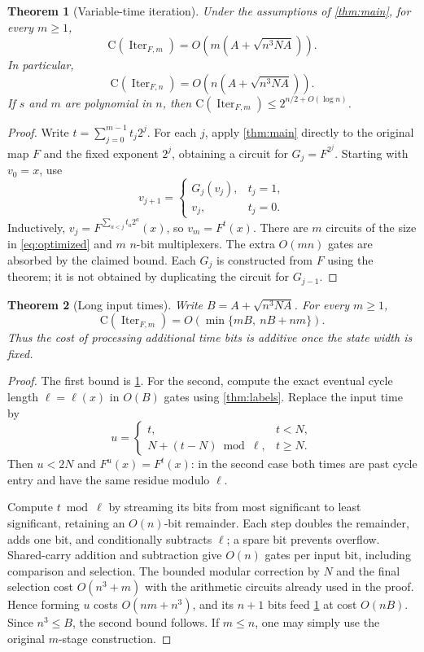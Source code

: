 \documentclass[11pt]{article}
\newtheorem{theorem}{Theorem}[section]
\theoremstyle{definition}
\theoremstyle{remark}
\newcommand{\CC}{\mathrm{C}}
\newcommand{\Iter}{\operatorname{Iter}}
\numberwithin{equation}{section}
\begin{document}
\begin{theorem}[Variable-time iteration]\label{thm:variable}
Under the assumptions of \cref{thm:main}, for every $m\geq 1$,
\begin{equation}\label{eq:variable}
  \CC(\Iter_{F,m})
  =O\!\left(m\left(A+\sqrt{n^3NA}\right)\right).
\end{equation}
In particular,
\[
  \CC(\Iter_{F,n})
  =O\!\left(n\left(A+\sqrt{n^3NA}\right)\right).
\]
If $s$ and $m$ are polynomial in $n$, then
$\CC(\Iter_{F,m})\leq 2^{n/2+O(\log n)}$.
\end{theorem}

\begin{proof}
Write $t=\sum_{j=0}^{m-1}t_j2^j$.  For each $j$, apply
\cref{thm:main} directly to the original map $F$ and the fixed exponent
$2^j$, obtaining a circuit for $G_j=F^{2^j}$.  Starting with $v_0=x$, use
\[
  v_{j+1}=
  \begin{cases}
    G_j(v_j),&t_j=1,\\
    v_j,&t_j=0.
  \end{cases}
\]
Inductively,
$v_j=F^{\sum_{a<j}t_a2^a}(x)$, so $v_m=F^t(x)$.
There are $m$ circuits of the size in \cref{eq:optimized} and $m$
$n$-bit multiplexers.  The extra $O(mn)$ gates are absorbed by the claimed
bound.  Each $G_j$ is constructed from $F$ using the theorem; it is not
obtained by duplicating the circuit for $G_{j-1}$.
\end{proof}

\begin{theorem}[Long input times]\label{thm:long-time}
Write $B=A+\sqrt{n^3NA}$.  For every $m\geq1$,
\[
 \CC(\Iter_{F,m})=O\!\left(\min\{mB,\ nB+nm\}\right).
\]
Thus the cost of processing additional time bits is additive once the
state width is fixed.
\end{theorem}
\begin{proof}
The first bound is \cref{thm:variable}.  For the second, compute the exact
eventual cycle length $\ell=\ell(x)$ in $O(B)$ gates using
\cref{thm:labels}.  Replace the input time by
\[
 u=\begin{cases}
 t,&t<N,\\
 N+(t-N)\bmod\ell,&t\geq N.
 \end{cases}
\]
Then $u<2N$ and $F^u(x)=F^t(x)$: in the second case both times are past
cycle entry and have the same residue modulo $\ell$.

Compute $t\bmod\ell$ by streaming its bits from most significant to least
significant, retaining an $O(n)$-bit remainder.  Each step doubles the
remainder, adds one bit, and conditionally subtracts $\ell$; a spare bit
prevents overflow.  Shared-carry addition and subtraction give $O(n)$
gates per input bit, including comparison and selection.  The bounded
modular correction by $N$ and the final selection cost $O(n^3+m)$ with
the arithmetic circuits already used in the proof.  Hence forming $u$
costs $O(nm+n^3)$, and its $n+1$ bits feed \cref{thm:variable} at cost
$O(nB)$.  Since $n^3\leq B$, the second bound follows.  If $m\leq n$,
one may simply use the original $m$-stage construction.
\end{proof}
\end{document}
